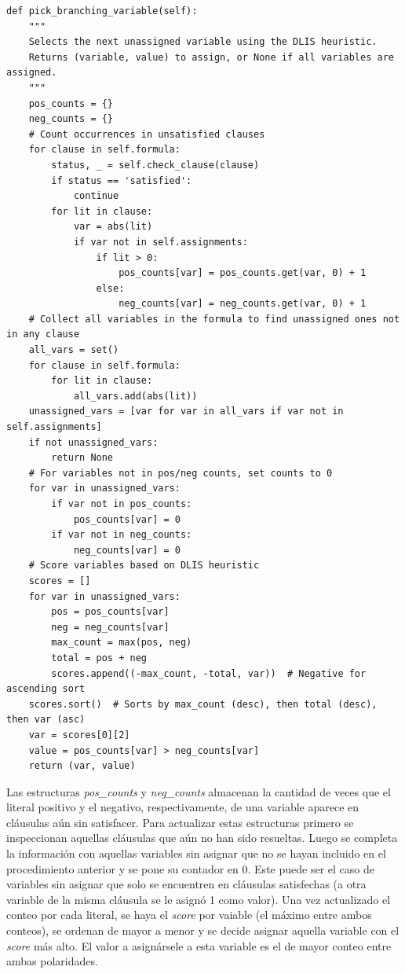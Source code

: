 \begin{lstlisting}
def pick_branching_variable(self):
    """
    Selects the next unassigned variable using the DLIS heuristic.
    Returns (variable, value) to assign, or None if all variables are assigned.
    """
    pos_counts = {}
    neg_counts = {}
    # Count occurrences in unsatisfied clauses
    for clause in self.formula:
        status, _ = self.check_clause(clause)
        if status == 'satisfied':
            continue
        for lit in clause:
            var = abs(lit)
            if var not in self.assignments:
                if lit > 0:
                    pos_counts[var] = pos_counts.get(var, 0) + 1
                else:
                    neg_counts[var] = neg_counts.get(var, 0) + 1
    # Collect all variables in the formula to find unassigned ones not in any clause
    all_vars = set()
    for clause in self.formula:
        for lit in clause:
            all_vars.add(abs(lit))
    unassigned_vars = [var for var in all_vars if var not in self.assignments]
    if not unassigned_vars:
        return None
    # For variables not in pos/neg counts, set counts to 0
    for var in unassigned_vars:
        if var not in pos_counts:
            pos_counts[var] = 0
        if var not in neg_counts:
            neg_counts[var] = 0
    # Score variables based on DLIS heuristic
    scores = []
    for var in unassigned_vars:
        pos = pos_counts[var]
        neg = neg_counts[var]
        max_count = max(pos, neg)
        total = pos + neg
        scores.append((-max_count, -total, var))  # Negative for ascending sort
    scores.sort()  # Sorts by max_count (desc), then total (desc), then var (asc)
    var = scores[0][2]
    value = pos_counts[var] > neg_counts[var]
    return (var, value)

\end{lstlisting}

Las estructuras \textit{pos\_counts} y \textit{neg\_counts} almacenan la cantidad de veces que el literal positivo y el negativo, respectivamente, de una variable aparece en cláusulas aún sin satisfacer. Para actualizar estas estructuras primero se inspeccionan aquellas cláusulas que aún no han sido resueltas. Luego se completa la información con aquellas variables sin asignar que no se hayan incluido en el procedimiento anterior y se pone su contador en 0. Este puede ser el caso de variables sin asignar que solo se encuentren en cláusulas satisfechas (a otra variable de la misma cláusula se le asignó 1 como valor). Una vez actualizado el conteo por cada literal, se haya el \textit{score} por vaiable (el máximo entre ambos conteos), se ordenan de mayor a menor y se decide asignar aquella variable con el \textit{score} más alto. El valor a asignársele a esta variable es el de mayor conteo entre ambas polaridades.

